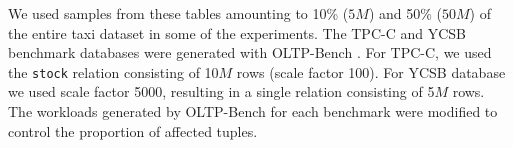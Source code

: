 We used samples from these tables amounting to 10\% ($5M$) and 50\% ($50M$) of the entire taxi dataset in some of the experiments. The TPC-C and YCSB benchmark databases were generated with OLTP-Bench \cite{DifallahPCC13}. For TPC-C, we used  the \texttt{stock} relation consisting of 10$M$ rows (scale factor 100).
 For YCSB database we used scale factor 5000, resulting in a single relation consisting of 5$M$ rows. The workloads generated by OLTP-Bench for each benchmark were modified to control the proportion of affected tuples.


